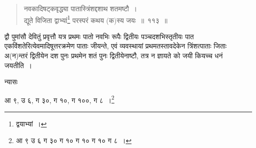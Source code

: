 \documentclass[10pt, openany]{book}
\begin{document}
{{{{{{{{{{{{{{\begin{quote}
{\eg नवकादिषट्कवृद्ध्या पातास्त्रिंशद्दशाथ शतमष्टौ~।\\
 द्यूते विजिता द्वाभ्यां\renewcommand{\thefootnote}{७}\footnote{द्वयाभ्यां~।} परस्परं कथय (क)स्य जयः~॥~११३~॥}\end{quote}

{द्वौ पुमांसौ देवितुं प्रवृत्तौ यत्र प्रथमः पातो नवभिः रूपैः द्वितीयः
पञ्चदशभिस्तृतीयः}
{पात एकविंशतेरित्येवमादिषूत्तरक्रमेण पाताः जीयन्ते, एवं व्यवस्थायां
प्रथमतस्तावदेकेन}
{त्रिंशत्पाताः जिताः अ(न)न्तरं द्वितीयेन दश पुनः प्रथमेन शतं पुनः
द्वितीयेनाष्टौ, तत्र न}
{ज्ञायते को जयी कियच्च धनं जयतीति~।}

\newpage

{न्यासः\textendash}
\vspace{2mm}

\hspace{15mm} {आ ९, उ ६, ग ३०, ग १०, ग १००, ग ८~।\renewcommand{\thefootnote}{१}\footnote{आ ९ उ ६ ग ३० ग १० ग १० ग १० ग ८~।}}
\vspace{3mm}

}}}}}}}}}}}}}}
\end{document}
